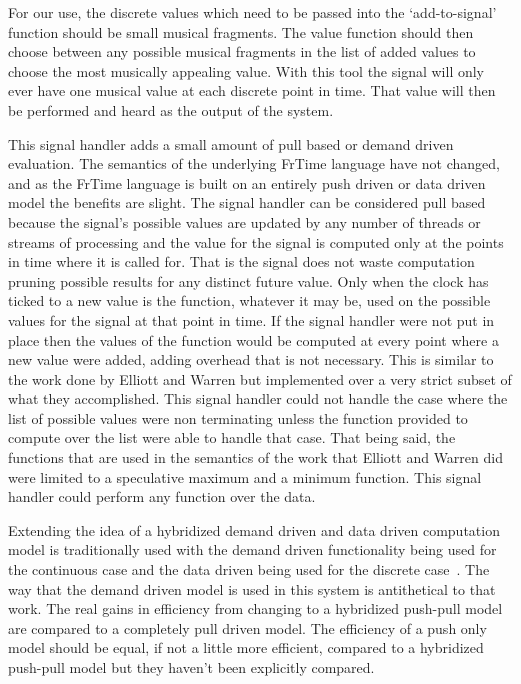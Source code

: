 \documentclass[12pt]{ucthesis}
\begin{document}
For our use, the discrete values which need to be passed into the `add-to-signal' function should be small musical fragments. The value function should then choose between any possible musical fragments in the list of added values to choose the most musically appealing value.  With this tool the signal will only ever have one musical value at each discrete point in time. That value will then be performed and heard as the output of the system. 

This signal handler adds a small amount of pull based or demand driven evaluation. The semantics of the underlying FrTime language have not changed, and as the FrTime language is built on an entirely push driven or data driven model the benefits are slight. The signal handler can be considered pull based because the signal's possible values are updated by any number of threads or streams of processing and the value for the signal is computed only at the points in time where it is called for. That is the signal does not waste computation pruning possible results for any distinct future value. Only when the clock has ticked to a new value is the function, whatever it may be, used on the possible values for the signal at that point in time. If the signal handler were not put in place then the values of the function would be computed at every point where a new value were added, adding overhead that is not necessary. This is similar to the work done by Elliott and Warren but implemented over a very strict subset of what they accomplished. This signal handler could not handle the case where the list of possible values were non terminating unless the function provided to compute over the list were able to handle that case. That being said, the functions that are used in the semantics of the work that Elliott and Warren did were limited to a speculative maximum and a minimum function. This signal handler could perform any function over the data. 



Extending the idea of a hybridized demand driven and data driven computation model is traditionally used with the demand driven functionality being used for the continuous case and the data driven being used for the discrete case~\cite{push-pull-frp}. The way that the demand driven model is used in this system is antithetical to that work. The real gains in efficiency from changing to a hybridized push-pull model are compared to a completely pull driven model. The efficiency of a push only model should be equal, if not a little more efficient, compared to a hybridized push-pull model but they haven't been explicitly compared.  
\end{document}
